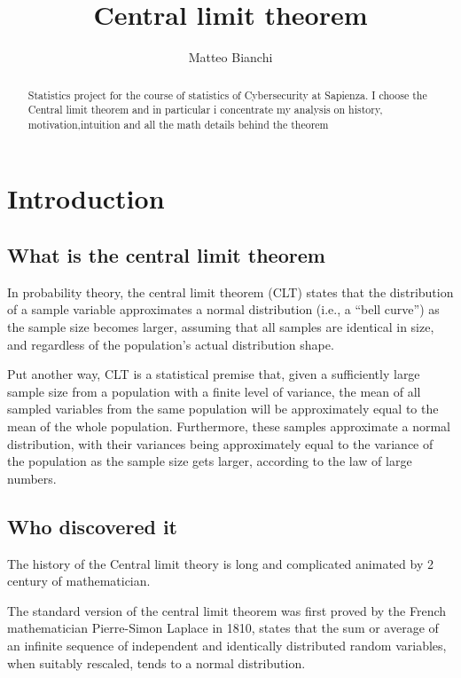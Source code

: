 \documentclass{article}
\title{Central limit theorem}
\author{Matteo Bianchi}
\begin{document}
\maketitle

\begin{abstract}
Statistics project for the course of statistics of Cybersecurity at Sapienza.
I choose the Central limit theorem and in particular i concentrate my analysis  on  history, motivation,intuition and  all the math details behind the theorem
\end{abstract}

\section{Introduction}
\subsection{What is the central limit theorem}
In probability theory, the central limit theorem (CLT) states that the distribution of a sample variable approximates a normal distribution (i.e., a “bell curve”) as the sample size becomes larger, assuming that all samples are identical in size, and regardless of the population's actual distribution shape.

Put another way, CLT is a statistical premise that, given a sufficiently large sample size from a population with a finite level of variance, the mean of all sampled variables from the same population will be approximately equal to the mean of the whole population. 
Furthermore, these samples approximate a normal distribution, with their variances being approximately equal to the variance of the population as the sample size gets larger, according to the law of large numbers.
\subsection{Who discovered it}
The history of the Central limit theory is long and complicated animated by 2 century of mathematician.

The standard version of the central limit theorem was first proved by the French mathematician Pierre-Simon Laplace in 1810, states that the sum or average of an infinite sequence of independent and identically distributed random variables, when suitably rescaled, tends to a normal distribution.
\end{document}
